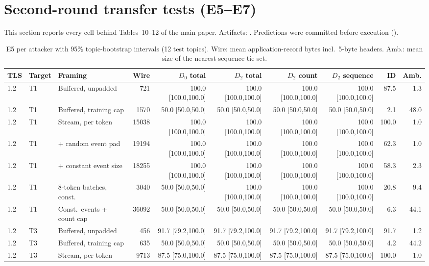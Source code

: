 \section{Second-round transfer tests (E5--E7)}\label{app:transfer}
This section reports every cell behind Tables~10--12 of the main paper. Artifacts: . Predictions were committed before execution ().
\begin{table}[!ht]\centering\scriptsize
\caption{E5 per attacker with 95\% topic-bootstrap intervals (12 test topics). Wire: mean application-record bytes incl.\ 5-byte headers. Amb.: mean size of the nearest-sequence tie set.}
\begin{tabular}{@{}lllrrrrrrr@{}}\toprule
TLS & Target & Framing & Wire & $D_0$ total & $D_2$ total & $D_2$ count & $D_2$ sequence & ID & Amb.\\\midrule
1.2 & T1 & Buffered, unpadded & 721 & 100.0 [100.0,100.0] & 100.0 [100.0,100.0] & 100.0 [100.0,100.0] & 100.0 [100.0,100.0] & 87.5 & 1.3\\
1.2 & T1 & Buffered, training cap & 1570 & 50.0 [50.0,50.0] & 50.0 [50.0,50.0] & 50.0 [50.0,50.0] & 50.0 [50.0,50.0] & 2.1 & 48.0\\
1.2 & T1 & Stream, per token & 15038 & 100.0 [100.0,100.0] & 100.0 [100.0,100.0] & 100.0 [100.0,100.0] & 100.0 [100.0,100.0] & 100.0 & 1.0\\
1.2 & T1 & + random event pad & 19194 & 100.0 [100.0,100.0] & 100.0 [100.0,100.0] & 100.0 [100.0,100.0] & 100.0 [100.0,100.0] & 62.3 & 1.0\\
1.2 & T1 & + constant event size & 18255 & 100.0 [100.0,100.0] & 100.0 [100.0,100.0] & 100.0 [100.0,100.0] & 100.0 [100.0,100.0] & 58.3 & 2.3\\
1.2 & T1 & 8-token batches, const. & 3040 & 50.0 [50.0,50.0] & 100.0 [100.0,100.0] & 100.0 [100.0,100.0] & 100.0 [100.0,100.0] & 20.8 & 9.4\\
1.2 & T1 & Const.\ events + count cap & 36092 & 50.0 [50.0,50.0] & 50.0 [50.0,50.0] & 50.0 [50.0,50.0] & 50.0 [50.0,50.0] & 6.3 & 44.1\\
1.2 & T3 & Buffered, unpadded & 456 & 91.7 [79.2,100.0] & 91.7 [79.2,100.0] & 91.7 [79.2,100.0] & 91.7 [79.2,100.0] & 91.7 & 1.2\\
1.2 & T3 & Buffered, training cap & 635 & 50.0 [50.0,50.0] & 50.0 [50.0,50.0] & 50.0 [50.0,50.0] & 50.0 [50.0,50.0] & 4.2 & 44.2\\
1.2 & T3 & Stream, per token & 9713 & 87.5 [75.0,100.0] & 87.5 [75.0,100.0] & 87.5 [75.0,100.0] & 87.5 [75.0,100.0] & 100.0 & 1.0\\

\end{tabular}
\end{table}

